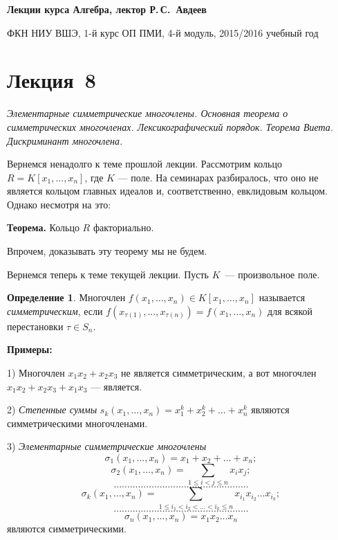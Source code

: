 \documentclass[a4paper,10pt]{amsart}
\theoremstyle{definition}
\newtheorem{definition}{Определение}
\theoremstyle{remark}
\begin{document}
%
\sloppy
%
\centerline{\large \bf Лекции курса \guillemotleft
Алгебра\guillemotright{}, лектор Р.\,С.~Авдеев}

\smallskip

\centerline{\large ФКН НИУ ВШЭ, 1-й курс ОП ПМИ, 4-й модуль,
2015/2016 учебный год}


\bigskip

\section*{Лекция~8}

\medskip

{\it Элементарные симметрические многочлены. Основная теорема о
симметрических многочленах. Лексикографический порядок. Теорема
Виета. Дискриминант многочлена.}

\medskip

Вернемся ненадолго к теме прошлой лекции. Рассмотрим кольцо $R = K[x_1, \ldots, x_n]$, где 	$K$ --- поле. 
На семинарах разбиралось, что оно не является кольцом главных идеалов и, соответственно, евклидовым кольцом. Однако несмотря на это:

\textbf{Теорема.} Кольцо $R$ факториально.

Впрочем, доказывать эту теорему мы не будем.

Вернемся теперь к теме текущей лекции. Пусть $K$~--- произвольное поле.

\begin{definition}
Многочлен $f(x_1,\ldots,x_n)\in K[x_1,\ldots,x_n]$ называется {\it
симметрическим}, если
$f(x_{\tau(1)},\ldots,x_{\tau(n)})=f(x_1,\ldots,x_n)$ для всякой
перестановки $\tau \in S_n$.
\end{definition}

\textbf{Примеры:}

1) Многочлен $x_1x_2 + x_2x_3$ не является симметрическим, а вот многочлен $x_1x_2 + x_2x_3 + x_1x_3$ --- является.

2) {\it Степенные суммы} $s_k(x_1, \ldots, x_n) = x_1^k + x_2^k +
\ldots + x_n^k$ являются симметрическими многочленами.

3) {\it Элементарные симметрические многочлены}
$$
\sigma_1(x_1, \ldots, x_n) = x_1 + x_2 + \ldots + x_n;
$$
$$
\sigma_2(x_1, \ldots, x_n) = \sum \limits_{1 \leqslant i < j
\leqslant n} x_i x_j;
$$
$$
..................................................
$$
$$
\sigma_k(x_1, \ldots, x_n) = \sum \limits_{1 \leqslant i_1 < i_2 <
\ldots < i_k \leqslant n} x_{i_1} x_{i_2} \ldots x_{i_k};
$$
$$
..................................................
$$
$$
\sigma_n(x_1, \ldots, x_n) = x_1 x_2 \ldots x_n
$$
являются симметрическими.
\end{document}

